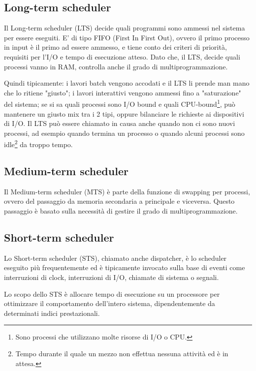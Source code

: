\subsection*{Long-term scheduler}
Il Long-term scheduler (LTS) decide quali programmi sono ammessi nel sistema per essere eseguiti. E' di tipo FIFO (First In First Out), ovvero il primo processo in input è il primo ad essere ammesso, e tiene conto dei criteri di priorità, requisiti per l'I/O e tempo di esecuzione atteso. Dato che, il LTS, decide quali processi vanno in RAM, controlla anche il grado di multiprogrammazione.

Quindi tipicamente: i lavori batch vengono accodati e il LTS li prende man mano che lo ritiene "giusto"; i lavori interattivi vengono ammessi fino a "saturazione" del sistema; se si sa quali processi sono I/O bound e quali CPU-bound\footnote{Sono processi che utilizzano molte risorse di I/O o CPU.}, può mantenere un giusto mix tra i 2 tipi, oppure bilanciare le richieste ai dispositivi di I/O. Il LTS può essere chiamato in causa anche quando non ci sono nuovi processi, ad esempio quando termina un processo o quando alcuni processi sono idle\footnote{Tempo durante il quale un mezzo non effettua nessuna attività ed è in attesa.} da troppo tempo.

\subsection*{Medium-term scheduler}
Il Medium-term scheduler (MTS) è parte della funzione di swapping per processi, ovvero del passaggio da memoria secondaria a principale e
viceversa. Questo passaggio è basato sulla necessità di gestire il grado di multiprogrammazione.

\subsection*{Short-term scheduler}
Lo Short-term scheduler (STS), chiamato anche dispatcher, è lo scheduler eseguito più frequentemente ed è tipicamente invocato sulla base di eventi come interruzioni di clock, interruzioni di I/O, chiamate di sistema o segnali.

Lo scopo dello STS è allocare tempo di esecuzione su un processore per ottimizzare il comportamento dell’intero sistema, dipendentemente da determinati indici prestazionali.

